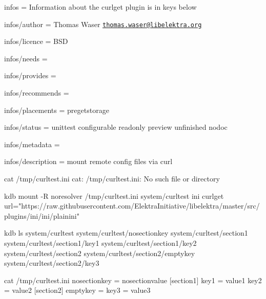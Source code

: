 
\begin{DoxyItemize}
\item infos = Information about the curlget plugin is in keys below
\item infos/author = Thomas Waser \href{mailto:thomas.waser@libelektra.org}{\tt thomas.\+waser@libelektra.\+org}
\item infos/licence = B\+S\+D
\item infos/needs =
\item infos/provides =
\item infos/recommends =
\item infos/placements = pregetstorage
\item infos/status = unittest configurable readonly preview unfinished nodoc
\item infos/metadata =
\item infos/description = mount remote config files via curl
\end{DoxyItemize}

\begin{DoxyVerb}cat /tmp/curltest.ini
cat: /tmp/curltest.ini: No such file or directory

kdb mount -R noresolver /tmp/curltest.ini system/curltest ini curlget url="https://raw.githubusercontent.com/ElektraInitiative/libelektra/master/src/plugins/ini/ini/plainini"

kdb ls system/curltest
system/curltest/nosectionkey
system/curltest/section1
system/curltest/section1/key1
system/curltest/section1/key2
system/curltest/section2
system/curltest/section2/emptykey
system/curltest/section2/key3

cat /tmp/curltest.ini
nosectionkey = nosectionvalue
[section1]
key1 = value1
key2 = value2
[section2]
emptykey =
key3 = value3\end{DoxyVerb}
 